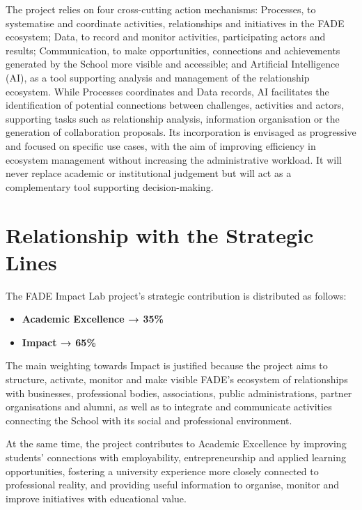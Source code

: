 \documentclass[11pt,a4paper]{scrreprt}
\begin{document}
The project relies on four cross-cutting action mechanisms: Processes, to systematise and coordinate activities, relationships and initiatives in the FADE ecosystem; Data, to record and monitor activities, participating actors and results; Communication, to make opportunities, connections and achievements generated by the School more visible and accessible; and Artificial Intelligence (AI), as a tool supporting analysis and management of the relationship ecosystem. While Processes coordinates and Data records, AI facilitates the identification of potential connections between challenges, activities and actors, supporting tasks such as relationship analysis, information organisation or the generation of collaboration proposals. Its incorporation is envisaged as progressive and focused on specific use cases, with the aim of improving efficiency in ecosystem management without increasing the administrative workload. It will never replace academic or institutional judgement but will act as a complementary tool supporting decision-making.

\section{Relationship with the Strategic Lines}

\small
The FADE Impact Lab project's strategic contribution is distributed as follows:

\begin{itemize}[noitemsep,topsep=2pt]
\item \textbf{Academic Excellence → 35\%}
\item \textbf{Impact → 65\%}
\end{itemize}

The main weighting towards Impact is justified because the project aims to structure, activate, monitor and make visible FADE's ecosystem of relationships with businesses, professional bodies, associations, public administrations, partner organisations and alumni, as well as to integrate and communicate activities connecting the School with its social and professional environment.

At the same time, the project contributes to Academic Excellence by improving students' connections with employability, entrepreneurship and applied learning opportunities, fostering a university experience more closely connected to professional reality, and providing useful information to organise, monitor and improve initiatives with educational value.
\end{document}

